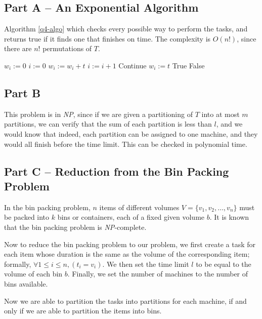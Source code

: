 \documentclass{article}
\begin{document}
\subsection*{Part A -- An Exponential Algorithm}

Algorithm \ref{q4-algo} which checks every possible way to perform the tasks, and returns true if it finds one that finishes on time. The complexity is \(O(n!)\), since there are \(n!\) permutations of \(T\).

\begin{algorithm}
	\begin{algorithmic}
		 
		\State \(w_i := 0\)
		\EndFor
		\State \(i := 0\)
		 
		\State \(w_i := w_i + t\) 
		\Else
		\State \(i := i + 1\) 
		\State Continue 
		\EndIf
		\State \(w_i := t\) 
		\EndIf
		\EndFor
		\State \Return True 
		\EndFor
		\State \Return False 
		\EndFunction
	\end{algorithmic}
	\caption{}
	\label{q4-algo}
\end{algorithm}

\subsection*{Part B}

This problem is in \textit{NP}, since if we are given a partitioning of \(T\) into at most \(m\) partitions, we can verify that the sum of each partition is less than \(l\), and we would know that indeed, each partition can be assigned to one machine, and they would all finish before the time limit. This can be checked in polynomial time.

\subsection*{Part C -- Reduction from the Bin Packing Problem}

In the bin packing problem, \(n\) items of different volumes \(V = \{v_1, v_2, \dots, v_n\}\) must be packed into \(k\) bins or containers, each of a fixed given volume \(b\). It is known that the bin packing problem is \textit{NP}-complete.

Now to reduce the bin packing problem to our problem, we first create a task for each item whose duration is the same as the volume of the corresponding item; formally, \(\forall 1 \leq i \leq n, (t_i = v_i)\). We then set the time limit \(l\) to be equal to the volume of each bin \(b\). Finally, we set the number of machines to the number of bins available.

Now we are able to partition the tasks into partitions for each machine, if and only if we are able to partition the items into bins.
\end{document}
